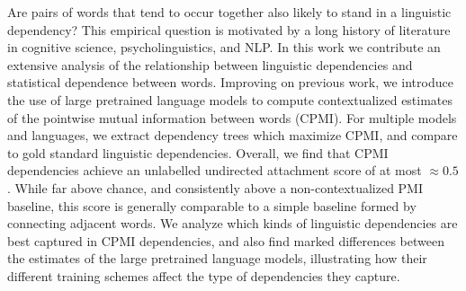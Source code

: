 Are pairs of words that tend to occur together also likely to stand in a linguistic dependency? This empirical question is motivated by a long history of literature in cognitive science, psycholinguistics, and NLP. In this work we contribute an extensive analysis of the relationship between linguistic dependencies and statistical dependence between words. Improving on previous work, we introduce the use of large pretrained language models to compute contextualized estimates of the pointwise mutual information between words (CPMI). For multiple models and languages, we extract dependency trees which maximize CPMI, and compare to gold standard linguistic dependencies.  Overall, we find that CPMI dependencies achieve an unlabelled undirected attachment score of at most $\approx 0.5$.  While far above chance, and consistently above a non-contextualized PMI baseline, this score is generally comparable to a simple baseline formed by connecting adjacent words.  We analyze which kinds of linguistic dependencies are best captured in CPMI dependencies, and also find marked differences between the estimates of the large pretrained language models, illustrating how their different training schemes affect the type of dependencies they capture.
